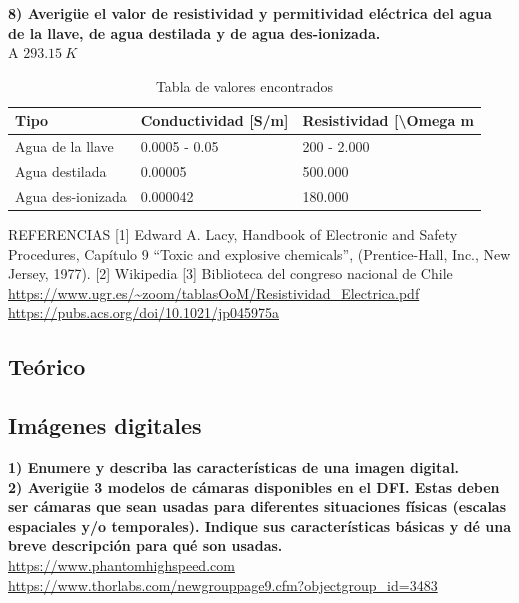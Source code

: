 \documentclass[letterpaper,11pt]{article}
\begin{document}
\textbf{8) Averigüe el valor de resistividad y permitividad eléctrica del agua de la llave, de agua destilada y de agua des-ionizada.}\\
A $\SI{293.15}{K}$ 
\begin{table}[H]
\centering
\caption{Tabla de valores encontrados}
\begin{tabular}{|l|l|l|}
\hline
Tipo              & Conductividad {[}S/m{]} & Resistividad {[}\textbackslash{}Omega m \\ \hline
Agua de la llave  & 0.0005 - 0.05           & 200 - 2.000                             \\ \hline
Agua destilada    & 0.00005                 & 500.000                                 \\ \hline
Agua des-ionizada & 0.000042                & 180.000                                 \\ \hline
\end{tabular}
\label{tab:tab1a} 
\end{table}

REFERENCIAS
[1] Edward A. Lacy, Handbook of Electronic and Safety Procedures, Capítulo 9 “Toxic
and explosive chemicals”, (Prentice-Hall, Inc., New Jersey, 1977).
[2] Wikipedia
[3] Biblioteca del congreso nacional de Chile
\url{https://www.ugr.es/~zoom/tablasOoM/Resistividad_Electrica.pdf}
\url{https://pubs.acs.org/doi/10.1021/jp045975a}



\subsection{Teórico}
\subsection{Imágenes digitales}
\textbf{1) Enumere y describa las características de una imagen digital.}\\


\textbf{2) Averigüe 3 modelos de cámaras disponibles en el DFI. Estas deben ser cámaras que sean usadas para diferentes situaciones físicas (escalas espaciales y/o temporales).
Indique sus características básicas y dé una breve descripción para qué son usadas.} \\ 
\url{https://www.phantomhighspeed.com}
\url{https://www.thorlabs.com/newgrouppage9.cfm?objectgroup_id=3483}
\end{document}
